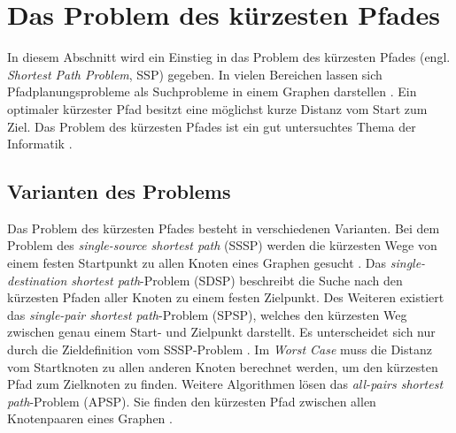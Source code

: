 \chapter{Das Problem des kürzesten Pfades}
\label{spp}
In diesem Abschnitt wird ein Einstieg in das Problem des kürzesten Pfades (engl. \textit{Shortest Path Problem}, SSP) gegeben. In vielen Bereichen lassen sich Pfadplanungsprobleme als Suchprobleme in einem Graphen darstellen \cite{HartNilssonandRaphael.1968}. Ein optimaler kürzester Pfad besitzt eine möglichst kurze Distanz vom Start zum Ziel. Das Problem des kürzesten Pfades ist ein gut untersuchtes Thema der Informatik \cite[S.1]{Madkour.2017}.


\section{Varianten des Problems}

Das Problem des kürzesten Pfades besteht in verschiedenen Varianten. Bei dem Problem des \textit{single-source shortest path} (SSSP) werden die kürzesten Wege von einem festen Startpunkt zu allen Knoten eines Graphen gesucht \cite[S.644]{Cormen.2009}. Das \textit{single-destination shortest path}-Problem (SDSP)  beschreibt die Suche nach den kürzesten Pfaden aller Knoten zu einem festen Zielpunkt. Des Weiteren existiert das \textit{single-pair shortest path}-Problem (SPSP), welches den kürzesten Weg zwischen genau einem Start- und Zielpunkt darstellt. Es unterscheidet sich nur durch die Zieldefinition vom SSSP-Problem \cite{Ottmann.2017}. Im \textit{Worst Case} muss die Distanz vom Startknoten zu allen anderen Knoten berechnet werden, um den kürzesten Pfad zum Zielknoten zu finden. Weitere Algorithmen lösen das \textit{all-pairs shortest path}-Problem (APSP). Sie finden den kürzesten Pfad zwischen allen Knotenpaaren eines Graphen \cite{Guting.2018}.


